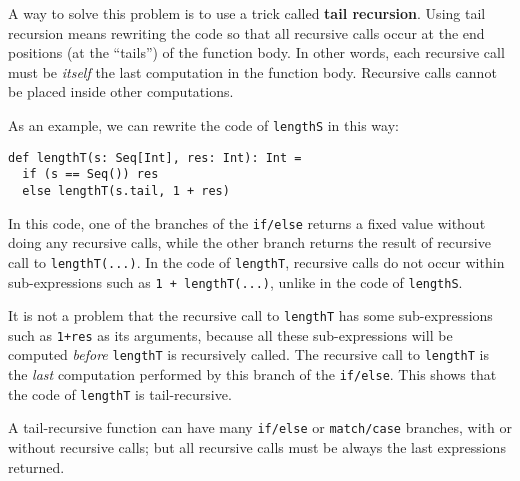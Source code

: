 A way to solve this problem is to use a trick called \textbf{tail
recursion}. Using tail recursion means rewriting
the code so that all recursive calls occur at the end positions (at
the ``tails'') of the function body. In other words, each recursive
call must be \emph{itself} the last computation in the function body.
Recursive calls cannot be placed inside other computations. 

As an example, we can rewrite the code of \lstinline!lengthS!
in this way:
\begin{lstlisting}
def lengthT(s: Seq[Int], res: Int): Int =
  if (s == Seq()) res
  else lengthT(s.tail, 1 + res)
\end{lstlisting}
In this code, one of the branches of the \lstinline!if/else!
returns a fixed value without doing any recursive calls, while the
other branch returns the result of recursive call to \lstinline!lengthT(...)!.
In the code of \lstinline!lengthT!,
recursive calls do not occur within sub-expressions such as \lstinline!1 + lengthT(...)!,
unlike in the code of \lstinline!lengthS!. 

It is not a problem that the recursive call to \lstinline!lengthT!
has some sub-expressions such as \lstinline!1+res!
as its arguments, because all these sub-expressions will be computed
\emph{before} \lstinline!lengthT!
is recursively called. The recursive call to \lstinline!lengthT!
is the \emph{last} computation performed by this branch of the \lstinline!if/else!.
This shows that the code of \lstinline!lengthT!
is tail-recursive.

A tail-recursive function can have many \lstinline!if/else!
or \lstinline!match/case!
branches, with or without recursive calls; but all recursive calls
must be always the last expressions returned.

